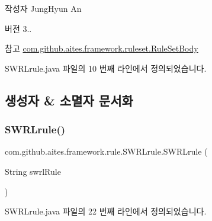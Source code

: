 \begin{DoxyAuthor}{작성자}
Jung\+Hyun An 
\end{DoxyAuthor}
\begin{DoxyVersion}{버전}
3.. 
\end{DoxyVersion}
\begin{DoxySeeAlso}{참고}
\mbox{\hyperlink{classcom_1_1github_1_1aites_1_1framework_1_1ruleset_1_1_rule_set_body}{com.\+github.\+aites.\+framework.\+ruleset.\+Rule\+Set\+Body}} 
\end{DoxySeeAlso}


S\+W\+R\+Lrule.\+java 파일의 10 번째 라인에서 정의되었습니다.



\subsection{생성자 \& 소멸자 문서화}
\mbox{\label{classcom_1_1github_1_1aites_1_1framework_1_1rule_1_1_s_w_r_lrule_a984917d455fb3d9bf7aecf46bfef72cd}} 
\subsubsection{\texorpdfstring{S\+W\+R\+Lrule()}{SWRLrule()}\hspace{0.1cm}{\footnotesize\ttfamily [1/2]}}
{\footnotesize\ttfamily com.\+github.\+aites.\+framework.\+rule.\+S\+W\+R\+Lrule.\+S\+W\+R\+Lrule (\begin{DoxyParamCaption}\item[{String}]{swrl\+Rule }\end{DoxyParamCaption})}



S\+W\+R\+Lrule.\+java 파일의 22 번째 라인에서 정의되었습니다.


